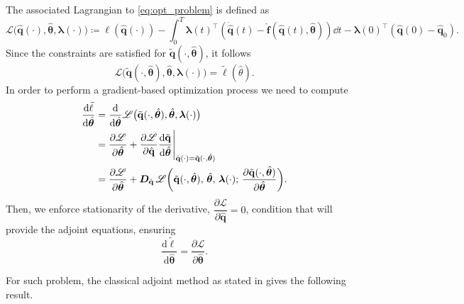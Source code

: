 The associated Lagrangian to \eqref{eq:opt_problem} is defined as\\
\begin{equation}
        \mathscr{L}\bigl(\hat{\mathbf{q}}(\cdot),\hat{\bm{\theta}},\bm{\lambda}(\cdot)\bigr) \coloneqq \ell(\hat{\mathbf{q}}(\cdot)) - \int_0^T \bm{\lambda}(t)^{\top}\left( \dot{\hat{\mathbf{q}}}(t)-\hat{\mathbf{f}}(\hat{\mathbf{q}}(t),\hat{\bm{\theta}}) \right)\dd t - \bm{\lambda}(0)^{\top}(\hat{\mathbf{q}}(0)-\hat{\mathbf{q}}_0).
        \label{eq:lagrange_cost}
    \end{equation}
Since the constraints are satisfied for $\tilde{\mathbf{q}}(\cdot,\hat{\bm{\theta}})$, it follows\\
$$\mathscr{L}\bigl(\tilde{\mathbf{q}}(\cdot,\hat{\bm{\theta}}),\hat{\bm{\theta}}, \bm{\lambda}(\cdot)\bigr) = \tilde{\ell} (\hat{\theta}).$$
In order to perform a gradient-based optimization process we need to compute\\
\begin{align*}
    \dv{\tilde{\ell}}{\hat{\bm{\theta}}} &= \dv{}{\hat{\bm{\theta}}} \mathscr{L}\bigl(\tilde{\mathbf{q}}(\cdot,\hat{\bm{\theta}}),\hat{\bm{\theta}},\bm{\lambda}(\cdot)\bigr) \\
    &= \dfrac{\partial\mathscr{L}}{\partial\hat{\bm{\theta}}} + \dfrac{\partial\mathscr{L}}{\partial\hat{\mathbf{q}}} \dfrac{\textrm{d}\tilde{\mathbf{q}}}{\textrm{d}\hat{\bm{\theta}}}\Bigg\vert_{\hat{\mathbf{q}}(\cdot) = \tilde{\mathbf{q}}(\cdot, \hat{\bm{\theta}} ) } \\
    &= 
  \frac{\partial\mathscr{L}}{\partial \hat{\bm{\theta}}}+
  \bm{D}_{\hat{\mathbf{q}}}\,\mathscr{L}\biggl(\tilde{\mathbf{q}}(\cdot,\hat{\bm{\theta}}),\,\hat{\bm{\theta}},\,\bm{\lambda}(\cdot);\,
    \dfrac{\partial\tilde{\mathbf{q}}(\cdot,\hat{\bm{\theta}})}{\partial\hat{\bm{\theta}}}
  \biggr).
\end{align*}
Then, we enforce stationarity of the derivative, $\dfrac{\partial\mathscr{L}}{\partial\hat{\mathbf{q}}} = 0$, condition that will provide the adjoint equations, ensuring\\
\begin{equation}
  \label{eq:equal_grad}
  \frac{\mathrm{d}\tilde{\ell}}{\mathrm{d}\hat{\bm{\theta}}}
  = \frac{\partial\mathscr{L}}{\partial\hat{\bm{\theta}}}.
\end{equation}

For such problem, the classical adjoint method as stated in \cite{bradley2024pde,luchini2024introduction} gives the following result.

